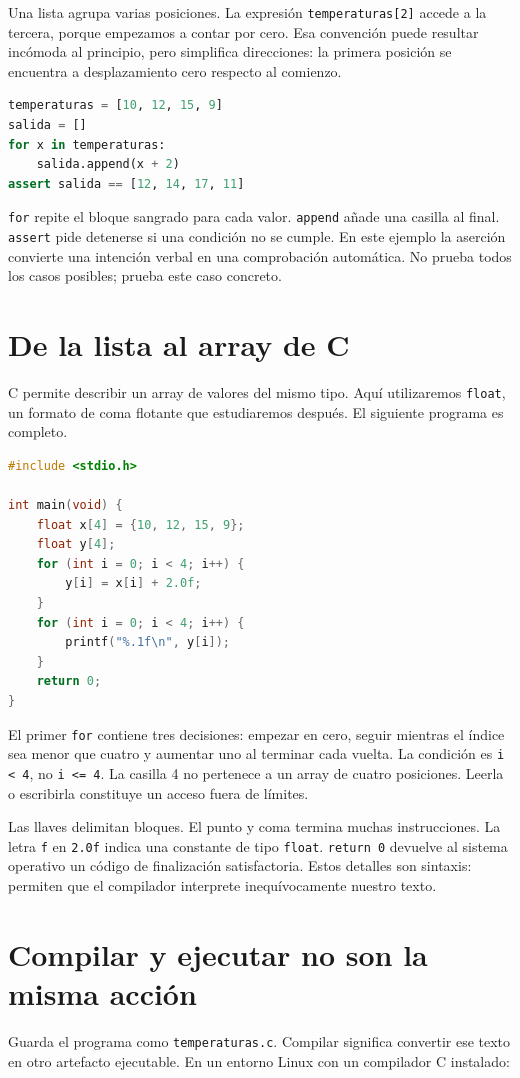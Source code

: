 \documentclass[12pt,a4paper,oneside]{report}
\begin{document}
Una lista agrupa varias posiciones. La expresión \texttt{temperaturas[2]} accede a la tercera, porque empezamos a contar por cero. Esa convención puede resultar incómoda al principio, pero simplifica direcciones: la primera posición se encuentra a desplazamiento cero respecto al comienzo.

\begin{lstlisting}[language=Python]
temperaturas = [10, 12, 15, 9]
salida = []
for x in temperaturas:
    salida.append(x + 2)
assert salida == [12, 14, 17, 11]
\end{lstlisting}
\texttt{for} repite el bloque sangrado para cada valor. \texttt{append} añade una casilla al final. \texttt{assert} pide detenerse si una condición no se cumple. En este ejemplo la aserción convierte una intención verbal en una comprobación automática. No prueba todos los casos posibles; prueba este caso concreto.

\section{De la lista al array de C}
C permite describir un array de valores del mismo tipo. Aquí utilizaremos \texttt{float}, un formato de coma flotante que estudiaremos después. El siguiente programa es completo.

\begin{lstlisting}[language=C]
#include <stdio.h>

int main(void) {
    float x[4] = {10, 12, 15, 9};
    float y[4];
    for (int i = 0; i < 4; i++) {
        y[i] = x[i] + 2.0f;
    }
    for (int i = 0; i < 4; i++) {
        printf("%.1f\n", y[i]);
    }
    return 0;
}
\end{lstlisting}
El primer \texttt{for} contiene tres decisiones: empezar en cero, seguir mientras el índice sea menor que cuatro y aumentar uno al terminar cada vuelta. La condición es \texttt{i < 4}, no \texttt{i <= 4}. La casilla 4 no pertenece a un array de cuatro posiciones. Leerla o escribirla constituye un acceso fuera de límites.

Las llaves delimitan bloques. El punto y coma termina muchas instrucciones. La letra \texttt{f} en \texttt{2.0f} indica una constante de tipo \texttt{float}. \texttt{return 0} devuelve al sistema operativo un código de finalización satisfactoria. Estos detalles son sintaxis: permiten que el compilador interprete inequívocamente nuestro texto.

\section{Compilar y ejecutar no son la misma acción}
Guarda el programa como \texttt{temperaturas.c}. Compilar significa convertir ese texto en otro artefacto ejecutable. En un entorno Linux con un compilador C instalado:
\end{document}
